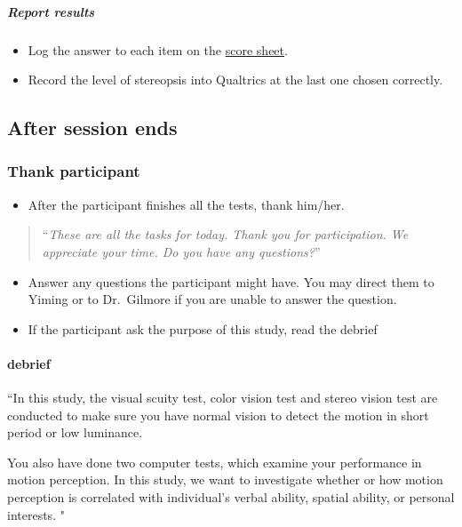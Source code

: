 \documentclass[]{article}
\providecommand{\tightlist}{%
  \setlength{\itemsep}{0pt}\setlength{\parskip}{0pt}}
\let\oldparagraph\paragraph
\renewcommand{\paragraph}[1]{\oldparagraph{#1}\mbox{}}
\let\oldsubparagraph\subparagraph
\renewcommand{\subparagraph}[1]{\oldsubparagraph{#1}\mbox{}}
\begin{document}
\subparagraph{Report results}\label{report-results-2}

\begin{itemize}
\tightlist
\item
  Log the answer to each item on the
  \href{vision-screening-score-sheet.html}{score sheet}.
\item
  Record the level of stereopsis into Qualtrics at the last one chosen
  correctly.
\end{itemize}

\subsection{After session ends}\label{after-session-ends}

\subsubsection{Thank participant}\label{thank-participant}

\begin{itemize}
\tightlist
\item
  After the participant finishes all the tests, thank him/her.
\end{itemize}

\begin{quote}
``\emph{These are all the tasks for today. Thank you for participation.
We appreciate your time. Do you have any questions?}''
\end{quote}

\begin{itemize}
\tightlist
\item
  Answer any questions the participant might have. You may direct them
  to Yiming or to Dr.~Gilmore if you are unable to answer the question.
\item
  If the participant ask the purpose of this study, read the debrief
\end{itemize}

\paragraph{debrief}\label{debrief}

``In this study, the visual scuity test, color vision test and stereo
vision test are conducted to make sure you have normal vision to detect
the motion in short period or low luminance.

You also have done two computer tests, which examine your performance in
motion perception. In this study, we want to investigate whether or how
motion perception is correlated with individual's verbal ability,
spatial ability, or personal interests. "
\end{document}
